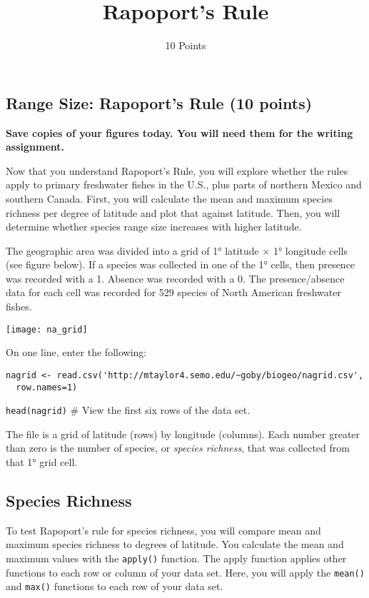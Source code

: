 \documentclass[11pt]{article}
\title{Rapoport's Rule}
\author{10 Points}
\date{}                                           %
\begin{document}
\thispagestyle{first_page}

\subsection*{Range Size: Rapoport's Rule (10 points)}

\textbf{Save copies of your figures today. You will need them for the
writing assignment.}

Now that you understand Rapoport's Rule, you will explore whether the 
rules apply to primary freshwater fishes in the U.S., plus parts of 
northern Mexico and southern Canada. First, you will calculate the 
mean and maximum species richness per degree of latitude and plot that 
against latitude. Then, you will determine whether species range size 
increases with higher latitude.

The geographic area was divided into a grid of 1° latitude $\times$ 1°
longitude cells (see figure below). If a species was collected in one 
of the 1° cells, then presence was recorded with a 1. Absence was 
recorded with a 0. The presence/absence data for each cell was 
recorded for 529 species of North American freshwater fishes.

\begin{center}
	\texttt{[image: na\_grid]}
\end{center}

On one line, enter the following:

\begin{verbatim}
nagrid <- read.csv('http://mtaylor4.semo.edu/~goby/biogeo/nagrid.csv', 
  row.names=1)
\end{verbatim}

\texttt{head(nagrid)} \qquad \# View the first six rows of the data set.

The file is a grid of latitude (rows) by longitude (columns). Each
number greater than zero is the number of species, or \emph{species
richness}, that was collected from that 1° grid cell.

\subsection*{Species Richness}

To test Rapoport's rule for species richness, you will compare mean and
maximum species richness to degrees of latitude. You calculate the
mean and maximum values with the \texttt{apply()} function. The apply
function applies other functions to each row or column 
of your data set. Here, you will apply the \texttt{mean()} and
\texttt{max()} functions to each row of your data set.
\end{document}
